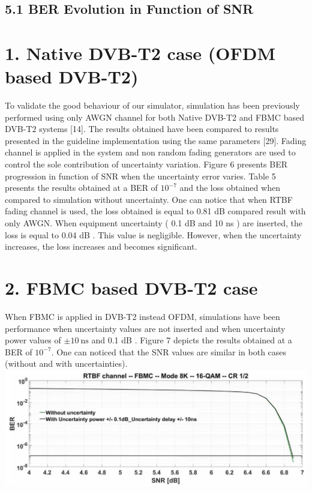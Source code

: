 \documentclass[10pt]{article}
\begin{document}
\subsection*{5.1 BER Evolution in Function of SNR}
\section*{1. Native DVB-T2 case (OFDM based DVB-T2)}
To validate the good behaviour of our simulator, simulation has been previously performed using only AWGN channel for both Native DVB-T2 and FBMC based DVB-T2 systems [14]. The results obtained have been compared to results presented in the guideline implementation using the same parameters [29]. Fading channel is applied in the system and non random fading generators are used to control the sole contribution of uncertainty variation. Figure 6 presents BER progression in function of SNR when the uncertainty error varies. Table 5 presents the results obtained at a BER of $10^{-7}$ and the loss obtained when compared to simulation without uncertainty. One can notice that when RTBF fading channel is used, the loss obtained is equal to 0.81 dB compared result with only AWGN. When equipment uncertainty ( 0.1 dB and 10 ns ) are inserted, the loss is equal to 0.04 dB . This value is negligible. However, when the uncertainty increases, the loss increases and becomes significant.

\section*{2. FBMC based DVB-T2 case}
When FBMC is applied in DVB-T2 instead OFDM, simulations have been performance when uncertainty values are not inserted and when uncertainty power values of $\pm 10 \mathrm{~ns}$ and 0.1 dB . Figure 7 depicts the results obtained at a BER of $10^{-7}$. One can noticed that the SNR values are similar in both cases (without and with uncertainties).\\
\includegraphics[max width=\textwidth, center]{2024_11_15_3776bfa3c020725d7730g-3}
\end{document}
